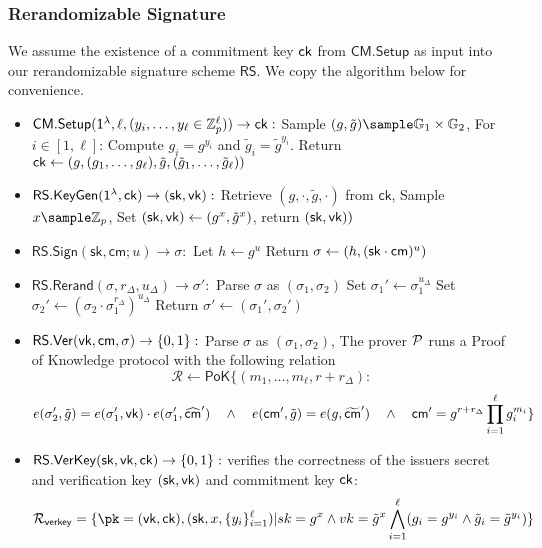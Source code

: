 \subsubsection{Rerandomizable Signature}\label{sig-construction}
We assume the existence of a commitment key $\mathsf{ck}$ from $\mathsf{CM.Setup}$ as input into our rerandomizable signature scheme $\mathsf{RS}$. We copy the algorithm below for convenience.
\begin{itemize}
    \item $\mathsf{CM.Setup}(\mathsf{1^{\lambda}}, \ell, (y_i, \ldots, y_{\ell} \in \mathbb{Z}_p^{\ell})) \to \mathsf{ck}:$  
    Sample $(g, \tilde{g}) \sample \G_1 \times \G_2$, For $i \in [1,\ell]$: Compute $g_i = g^{y_i}$ and $\tilde{g}_i = \tilde{g}^{y_i}$. Return $\mathsf{ck} \gets (g, (g_1,\ldots,g_\ell), \tilde{g}, (\tilde{g}_1,\ldots,\tilde{g}_\ell))$
    
    \item $\mathsf{RS.KeyGen}(\mathsf{1^{\lambda}}, \mathsf{ck}) \to (\mathsf{sk}, \mathsf{vk}):$ 
        Retrieve $(g, \cdot, \tilde{g}, \cdot)$ from $\mathsf{ck}$,
        Sample $x \sample \Z_p$,
        Set $(\mathsf{sk}, \mathsf{vk}) \gets (g^x, \tilde{g}^x)$, return $(\mathsf{sk}, \mathsf{vk}))$
    
    \item $\mathsf{RS.Sign}(\mathsf{sk}, \mathsf{cm}; u) \to \sigma:$ 
        Let $h \gets g^u$
        Return $\sigma \gets (h, (\mathsf{sk} \cdot \mathsf{cm})^u)$
    
    \item $\mathsf{RS.Rerand}(\sigma, r_\Delta, u_\Delta) \to \sigma':$
        Parse $\sigma$ as $(\sigma_1, \sigma_2)$
        Set $\sigma_1' \gets \sigma_1^{u_\Delta}$
        Set $\sigma_2' \gets (\sigma_2 \cdot \sigma_1^{r_\Delta})^{u_\Delta}$
        Return $\sigma' \gets (\sigma_1', \sigma_2')$
    
    \item $\mathsf{RS.Ver}(\mathsf{vk}, \mathsf{cm}, \sigma) \to \{0,1\}:$
        Parse $\sigma$ as $(\sigma_1, \sigma_2)$, The prover $\mathcal{P}$ runs a Proof of Knowledge protocol with the following relation 
    \[
        \mathcal{R} \gets \mathsf{PoK}\{(m_1,\ldots,m_\ell, r + r_\Delta): 
    \]
    \[
         e(\sigma_2', \tilde{g}) = e(\sigma_1', \mathsf{vk})\cdot e(\sigma_1', \widehat{\mathsf{cm}}') \quad \wedge \quad
        e(\mathsf{cm}', \tilde{g}) = e(g, \widetilde{\mathsf{cm}}') \quad \wedge \quad
        \mathsf{cm}' = g^{r + r_\Delta} \prod_{i=1}^\ell g_i^{m_i}
        \}
    \]

        \item $\mathsf{RS.VerKey}(\mathsf{sk}, \mathsf{vk}, \mathsf{ck}) \to \{0,1\}:$ verifies the correctness of the issuers secret and verification key $(\mathsf{sk}, \mathsf{vk})$ and commitment key $\mathsf{ck}$:
        \[
        \mathcal{R}_{\mathsf{verkey}} = \{\pk = (\vk, \ck),(\sk, x, \{y_i\}_{i=1}^\ell) | sk = g^x \wedge vk = \tilde{g}^x \bigwedge_{i=1}^\ell (g_i = g^{y_i} \wedge \tilde{g}_i = \tilde{g}^{y_i})\}
        \]
        
\end{itemize}


